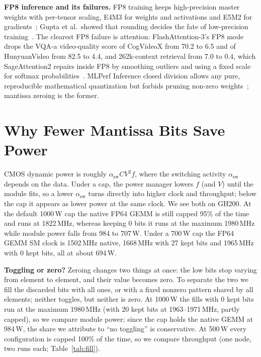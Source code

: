 \documentclass[conference]{IEEEtran}
\newcommand{\W}{\,W}
\newcommand{\pct}{\%}
\begin{document}
\textbf{FP8 inference and its failures.} FP8 training keeps high-precision master weights with per-tensor
scaling, E4M3 for weights and activations and E5M2 for gradients~\cite{Micikevicius2022}; Gupta et al.\ showed that
rounding decides the fate of low-precision training~\cite{Gupta2015}. The clearest FP8 failure is attention:
FlashAttention-3's FP8 mode drops the VQA-a video-quality score of CogVideoX from 70.2 to 6.5 and of HunyuanVideo from
82.5 to 4.4, and 262k-context retrieval from 7.0 to 0.4, which SageAttention2 repairs inside FP8 by smoothing outliers and using a fixed scale for softmax
probabilities~\cite{Zhang2025}. MLPerf Inference closed division allows any pure, reproducible mathematical
quantization but forbids pruning non-zero weights~\cite{MLPerfInfRules}; mantissa zeroing is the former.

\section{Why Fewer Mantissa Bits Save Power}\label{sec:why}

CMOS dynamic power is roughly $\alpha_\mathrm{sw} C V^2 f$, where the switching activity $\alpha_\mathrm{sw}$ depends
on the data. Under a cap, the power manager lowers $f$ (and $V$) until the module fits, so a lower $\alpha_\mathrm{sw}$
turns directly into higher clock and throughput; below the cap it appears as lower power at the same clock. We see both on GH200. At the default
1000\W{} cap the native FP64 GEMM is still capped 95\pct{} of the time and runs at 1822\,MHz, whereas keeping 0 bits
it runs at the maximum 1980\,MHz while module power falls from 984 to 707\W. Under a 700\W{} cap the FP64 GEMM SM
clock is 1502\,MHz native, 1668\,MHz with 27 kept bits and 1965\,MHz with 0 kept bits, all at about 694\W.

\textbf{Toggling or zero?} Zeroing changes two things at once: the low bits stop varying from element to element,
and their value becomes zero. To separate the two we fill the discarded bits with all ones, or with a fixed
nonzero pattern shared by all elements; neither toggles, but neither is zero. At 1000\W{} the fills with 0 kept bits run at the
maximum 1980\,MHz (with 20 kept bits at 1963--1971\,MHz, partly capped), so we compare module power; since the cap holds the native GEMM at 984\W, the share we attribute
to ``no toggling'' is conservative. At 500\W{} every configuration is capped 100\pct{} of the time, so we compare
throughput (one node, two runs each; Table~\ref{tab:fill}).
\end{document}
